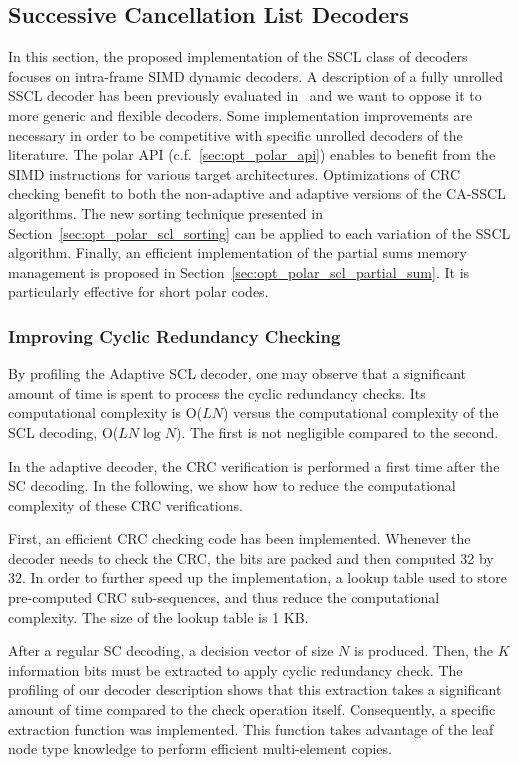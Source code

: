 \subsection{Successive Cancellation List Decoders}
\label{sec:opt_polar_scl}

In this section, the proposed implementation of the SSCL class of decoders
focuses on intra-frame SIMD dynamic decoders. A description of a fully unrolled
SSCL decoder has been previously evaluated in~\cite{Sarkis2016} and we want to
oppose it to more generic and flexible decoders. Some implementation
improvements are necessary in order to be competitive with specific unrolled
decoders of the literature. The polar API (c.f.~\ref{sec:opt_polar_api}) enables
to benefit from the SIMD instructions for various target architectures.
Optimizations of CRC checking benefit to both the non-adaptive and adaptive
versions of the CA-SSCL algorithms. The new sorting technique presented in
Section~\ref{sec:opt_polar_scl_sorting} can be applied to each variation of the
SSCL algorithm. Finally, an efficient implementation of the partial sums memory
management is proposed in Section~\ref{sec:opt_polar_scl_partial_sum}. It is
particularly effective for short polar codes.

\subsubsection{Improving Cyclic Redundancy Checking}
\label{sec:opt_polar_scl_crc}

By profiling the Adaptive SCL decoder, one may observe that a significant amount
of time is spent to process the cyclic redundancy checks. Its computational
complexity is O($LN$) versus the computational complexity of the SCL decoding,
O($LN\log N$). The first is not negligible compared to the second.

In the adaptive decoder, the CRC verification is performed a first time after
the SC decoding. In the following, we show how to reduce the computational
complexity of these CRC verifications.

First, an efficient CRC checking code has been implemented. Whenever the decoder
needs to check the CRC, the bits are packed and then computed 32 by 32. In order
to further speed up the implementation, a lookup table used to store
pre-computed CRC sub-sequences, and thus reduce the computational complexity.
The size of the lookup table is 1 KB.

After a regular SC decoding, a decision vector of size $N$ is produced. Then,
the $K$ information bits must be extracted to apply cyclic redundancy check. The
profiling of our decoder description shows that this extraction takes a
significant amount of time compared to the check operation itself. Consequently,
a specific extraction function was implemented. This function takes advantage of
the leaf node type knowledge to perform efficient multi-element copies.

